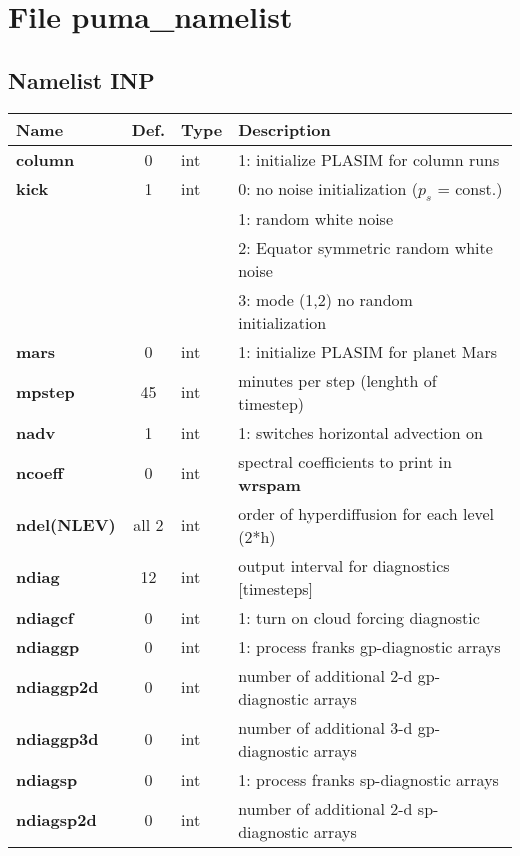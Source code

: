 \section{File puma\_namelist}
\subsection{Namelist INP}
\begin{tabular}{|l|c|l|l|}                                  
\hline                                                        
{\bf Name      }&Def.&Type & Description \\               
\hline                                                        
{\bf column    }&   0 & int & 1: initialize PLASIM for column runs \\
{\bf kick      }&  1 & int & 0: no noise initialization ($p_s$ = const.) \\         
{\bf           }&     &     & 1: random white noise                \\
{\bf           }&     &     & 2: Equator symmetric random white noise  \\
{\bf           }&     &     & 3: mode (1,2) no random initialization  \\
{\bf mars      }&   0 & int & 1: initialize PLASIM for planet Mars \\
{\bf mpstep    }&  45 & int & minutes per step (lenghth of timestep) \\
{\bf nadv      }&   1 & int & 1: switches horizontal advection on \\
{\bf ncoeff    }&   0 & int & spectral coefficients to print in {\bf wrspam}\\
{\bf ndel(NLEV)}&all 2& int & order of hyperdiffusion for each level (2*h)\\
{\bf ndiag     }&  12 & int & output interval for diagnostics [timesteps] \\   
{\bf ndiagcf   }&   0 & int & 1: turn on cloud forcing diagnostic \\
{\bf ndiaggp   }&   0 & int & 1: process franks gp-diagnostic arrays \\
{\bf ndiaggp2d }&   0 & int & number of additional 2-d gp-diagnostic arrays \\
{\bf ndiaggp3d }&   0 & int & number of additional 3-d gp-diagnostic arrays  \\
{\bf ndiagsp   }&   0 & int & 1: process franks sp-diagnostic arrays \\
{\bf ndiagsp2d }&   0 & int & number of additional 2-d sp-diagnostic arrays \\

\end{tabular}
